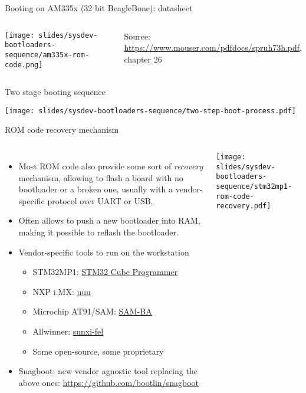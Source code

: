\begin{frame}{Booting on AM335x (32 bit BeagleBone): datasheet}
  \begin{columns}[T]
      \begin{center}
        \texttt{[image: slides/sysdev-bootloaders-sequence/am335x-rom-code.png]}
      \end{center}
      {\tiny
        Source:\\
        \url{https://www.mouser.com/pdfdocs/spruh73h.pdf},\\
	chapter 26
      }
    \end{columns}
\end{frame}

\begin{frame}{Two stage booting sequence}
  \begin{center}
    \texttt{[image: slides/sysdev-bootloaders-sequence/two-step-boot-process.pdf]}
  \end{center}
\end{frame}

\begin{frame}{ROM code recovery mechanism}
  \begin{columns}[T]
    \begin{itemize}
    \item Most ROM code also provide some sort of {\em recovery}
      mechanism, allowing to flash a board with no bootloader or a broken
      one, usually with a vendor-specific protocol over UART or USB.
    \item Often allows to push a new bootloader into RAM, making it
      possible to reflash the bootloader.
    \item Vendor-specific tools to run on the workstation
      \begin{itemize}
      \item STM32MP1: \href{https://www.st.com/en/development-tools/stm32cubeprog.html}{STM32 Cube Programmer}
      \item NXP i.MX: \href{https://github.com/NXPmicro/mfgtools}{uuu}
      \item Microchip AT91/SAM: \href{https://www.microchip.com/en-us/development-tool/SAM-BA-In-system-Programmer}{SAM-BA}
      \item Allwinner: \href{https://github.com/linux-sunxi/sunxi-tools}{sunxi-fel}
      \item Some open-source, some proprietary
      \end{itemize}
    \item Snagboot: new vendor agnostic tool replacing the above ones:
          \url{https://github.com/bootlin/snagboot}
    \end{itemize}
    \texttt{[image: slides/sysdev-bootloaders-sequence/stm32mp1-rom-code-recovery.pdf]}
  \end{columns}
\end{frame}

